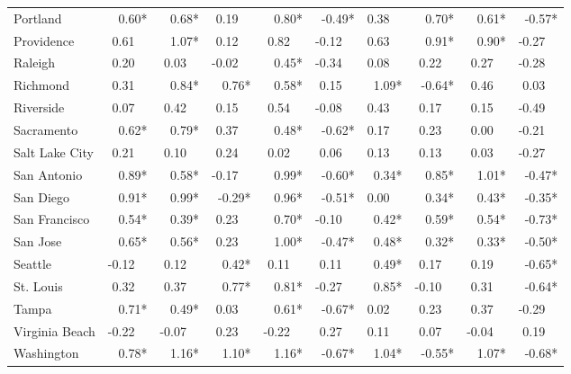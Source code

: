 \begin{tabular}{lrrrrrrrrr}
	Portland       &   0.60* &   0.68* &  0.19~~ &   0.80* &  -0.49* &  0.38~~ &   0.70* &   0.61* &  -0.57* \\
	Providence     &  0.61~~ &   1.07* &  0.12~~ &  0.82~~ & -0.12~~ &  0.63~~ &   0.91* &   0.90* & -0.27~~ \\
	Raleigh        &  0.20~~ &  0.03~~ & -0.02~~ &   0.45* & -0.34~~ &  0.08~~ &  0.22~~ &  0.27~~ & -0.28~~ \\
	Richmond       &  0.31~~ &   0.84* &   0.76* &   0.58* &  0.15~~ &   1.09* &  -0.64* &  0.46~~ &  0.03~~ \\
	Riverside      &  0.07~~ &  0.42~~ &  0.15~~ &  0.54~~ & -0.08~~ &  0.43~~ &  0.17~~ &  0.15~~ & -0.49~~ \\
	Sacramento     &   0.62* &   0.79* &  0.37~~ &   0.48* &  -0.62* &  0.17~~ &  0.23~~ &  0.00~~ & -0.21~~ \\
	Salt Lake City &  0.21~~ &  0.10~~ &  0.24~~ &  0.02~~ &  0.06~~ &  0.13~~ &  0.13~~ &  0.03~~ & -0.27~~ \\
	San Antonio    &   0.89* &   0.58* & -0.17~~ &   0.99* &  -0.60* &   0.34* &   0.85* &   1.01* &  -0.47* \\
	San Diego      &   0.91* &   0.99* &  -0.29* &   0.96* &  -0.51* &  0.00~~ &   0.34* &   0.43* &  -0.35* \\
	San Francisco  &   0.54* &   0.39* &  0.23~~ &   0.70* & -0.10~~ &   0.42* &   0.59* &   0.54* &  -0.73* \\
	San Jose       &   0.65* &   0.56* &  0.23~~ &   1.00* &  -0.47* &   0.48* &   0.32* &   0.33* &  -0.50* \\
	Seattle        & -0.12~~ &  0.12~~ &   0.42* &  0.11~~ &  0.11~~ &   0.49* &  0.17~~ &  0.19~~ &  -0.65* \\
	St. Louis      &  0.32~~ &  0.37~~ &   0.77* &   0.81* & -0.27~~ &   0.85* & -0.10~~ &  0.31~~ &  -0.64* \\
	Tampa          &   0.71* &   0.49* &  0.03~~ &   0.61* &  -0.67* &  0.02~~ &  0.23~~ &  0.37~~ & -0.29~~ \\
	Virginia Beach & -0.22~~ & -0.07~~ &  0.23~~ & -0.22~~ &  0.27~~ &  0.11~~ &  0.07~~ & -0.04~~ &  0.19~~ \\
	Washington     &   0.78* &   1.16* &   1.10* &   1.16* &  -0.67* &   1.04* &  -0.55* &   1.07* &  -0.68* \\ \bottomrule
\end{tabular}
\normalsize